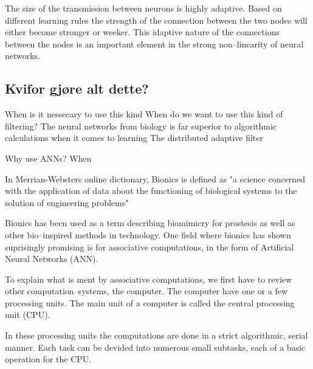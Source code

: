 	The size of the transmission between neurons is highly adaptive. Based on different learning rules the strength of the connection between the two nodes will either become stronger or weeker.
	This idaptive nature of the connections between the nodes is an important element in the strong non--linearity of neural networks.

	\subsection{Kvifor gjøre alt dette?}
	When is it nessecary to use this kind
	When do we want to use this kind of filtering?
	The neural networks from biology is far superior to algorithmic calculations when it comes to learning
	The distributed adaptive filter 

	Why use ANNs? 
	When 























In Merrian-Websters online dictionary, Bionics is defined as 
"a science concerned with the application of data about the functioning of biological systems to the solution of engineering problems"

Bionics has been used as a term describing biomimicry for prostesis as well as other bio--inspired methods in technology.
One field where bionics has shown suprisingly promising is for associative computations, in the form of Artificial Neural Networks (ANN).

To explain what is ment by associative computations, we first have to review other computation--systems, the computer.
The computer have one or a few processing units. The main unit of a computer is called the central processing unit (CPU).

In these processing units the computations are done in a strict algorithmic, serial manner.
Each task can be devided into numerous small subtasks, each of a basic operation for the CPU.

